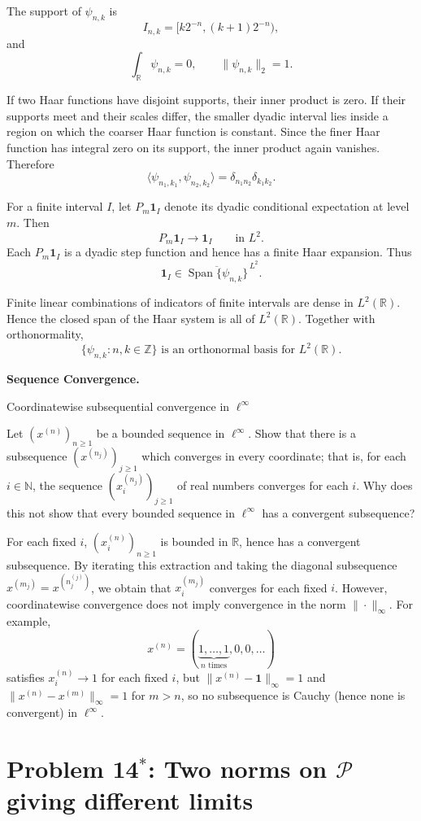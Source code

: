 \begin{solution}
The support of \(\psi_{n,k}\) is
\[
I_{n,k}
=
[k2^{-n},(k+1)2^{-n}),
\]
and
\[
\int_{\mathbb R}\psi_{n,k}=0,
\qquad
\|\psi_{n,k}\|_2=1.
\]

If two Haar functions have disjoint supports, their inner product is
zero. If their supports meet and their scales differ, the smaller
dyadic interval lies inside a region on which the coarser Haar
function is constant. Since the finer Haar function has integral zero
on its support, the inner product again vanishes. Therefore
\[
\langle\psi_{n_1,k_1},\psi_{n_2,k_2}\rangle
=
\delta_{n_1n_2}\delta_{k_1k_2}.
\]

For a finite interval \(I\), let \(P_m\mathbf1_I\) denote its dyadic
conditional expectation at level \(m\). Then
\[
P_m\mathbf1_I\longrightarrow\mathbf1_I
\qquad\text{in }L^2.
\]
Each \(P_m\mathbf1_I\) is a dyadic step function and hence has a
finite Haar expansion. Thus
\[
\mathbf1_I
\in
\overline{\operatorname{Span}\{\psi_{n,k}\}}^{\,L^2}.
\]

Finite linear combinations of indicators of finite intervals are
dense in \(L^2(\mathbb R)\). Hence the closed span of the Haar system
is all of \(L^2(\mathbb R)\). Together with orthonormality,
\[
\boxed{
\{\psi_{n,k}:n,k\in\mathbb Z\}
\text{ is an orthonormal basis for }L^2(\mathbb R).
}
\]
\end{solution}


\begin{problem}[CP-II-0181]
\label{prob:cp-ii-0181}
\textbf{Sequence Convergence.}

\hspace*{1.5em}Coordinatewise subsequential convergence in $\ell^\infty$

Let $(x^{(n)})_{n\ge1}$ be a bounded sequence in $\ell^\infty$.
Show that there is a subsequence $(x^{(n_j)})_{j\ge1}$ which converges in every coordinate; that is,
for each $i\in\mathbb{N}$, the sequence $(x^{(n_j)}_i)_{j\ge1}$ of real numbers converges for each $i$.
Why does this not show that every bounded sequence in $\ell^\infty$ has a convergent subsequence?
\end{problem}

\begin{solution}
For each fixed $i$, $(x^{(n)}_i)_{n\ge1}$ is bounded in $\mathbb{R}$, hence has a convergent subsequence.
By iterating this extraction and taking the diagonal subsequence $x^{(m_j)}=x^{(n^{(j)}_j)}$,
we obtain that $x^{(m_j)}_i$ converges for each fixed $i$.
However, coordinatewise convergence does not imply convergence in the norm $\|\cdot\|_\infty$.
For example,
\[
x^{(n)}=(\underbrace{1,\dots,1}_{n\text{ times}},0,0,\dots)
\]
satisfies $x^{(n)}_i\to 1$ for each fixed $i$, but
$\|x^{(n)}-\mathbf{1}\|_\infty=1$ and $\|x^{(n)}-x^{(m)}\|_\infty=1$ for $m>n$,
so no subsequence is Cauchy (hence none is convergent) in $\ell^\infty$.

\bigskip
\section*{Problem 14$^*$: Two norms on $\mathcal{P}$ giving different limits}
\end{solution}

